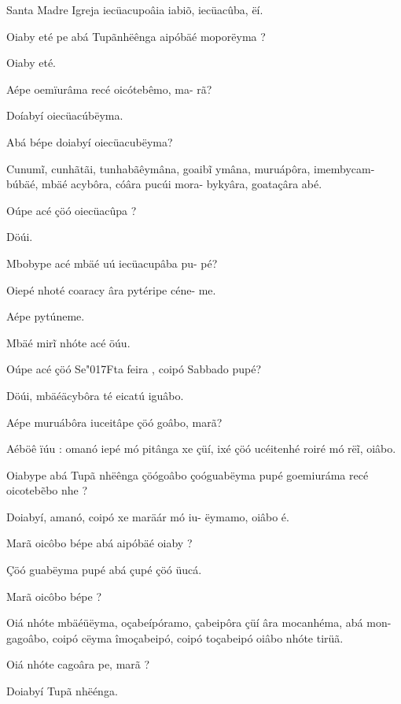 \documentclass[openany,titlepage,12pt]{book}
\newcommand{\lgS}{\char"017F}
\begin{document}
\begin{altereven}
    \item Santa Madre Igreja iecüacupoâia iabiõ,
        iecüacûba, ëí.
    \item Oiaby eté pe abá Tupãnhëênga aipóbäé
        moporëyma ?
    \item Oiaby eté.
    \item Aépe oemïurâma recé oicótebêmo, ma-
        rã?
    \item Doíabyí oiecüacúbëyma.
    \item Abá bépe doiabyí oiecüacubëyma?
    \item Cunum\~i, cunhãtãi, tunhabãêymâna,\linebreak
        goaib\~i ymâna, muruápôra, imembycam-
        búbäé, mbäé acybôra, cóâra pucúi mora-
        bykyâra, goataçâra abé.
    \item Oúpe acé çöó oiecüacûpa ?
    \item Döúi.
    \item Mbobype acé mbäé uú iecüacupâba pu-
        pé?
    \item Oiepé nhoté coaracy âra pytéripe céne-
        me.
    \item Aépe pytúneme.
    \item Mbäé mir\~i nhóte acé öúu.
    \item Oúpe acé çöó Se\lgS ta feira , coipó Sabbado
        pupé?
    \item Döúi, mbäéäcybôra té eicatú iguâbo.
    \item Aépe muruábôra iuceitâpe çöó goâbo,
        marã?        
    \item Aéböê ïúu : omanó iepé mó pitânga xe
        çüí, ixé çöó ucéitenhé roiré mó rë\~i, oiâbo.        
    \item Oiabype abá Tupã nhëênga çöógoâbo\linebreak
        çoóguabëyma pupé goemiuráma recé
        oicoteb\~ebo nhe ?
    \item Doiabyí, amanó, coipó xe maräár mó iu-        
        ëymamo, oiâbo é.
    \item Marã oicôbo bépe abá aipóbäé oiaby ?        
    \item Çöó guabëyma pupé abá çupé çöó üucá.        
    \item Marã oicôbo bépe ?
    \item Oiá nhóte mbäéüëyma, oçabeípóramo,
        çabeipôra çüí âra mocanhéma, abá mon-        
        gagoâbo, coipó cëyma îmoçabeipó, coipó
        toçabeipó oiâbo nhóte tirüã.
    \item Oiá nhóte cagoâra pe, marã ?
    \item Doiabyí Tupã nhëénga.
    
\end{altereven}
\end{document}
